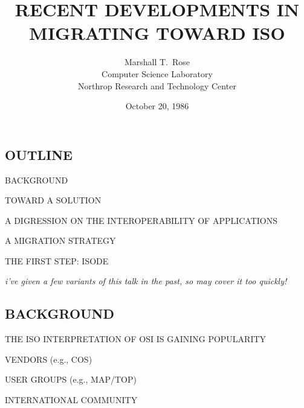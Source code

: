 



\def\tradeORGfont{\rm}
\def\tradeNAMfont{\rm}

\def\tcptpgw/{TCP $\Longleftrightarrow$ TP MAGIC-BOX}

\raggedright



\title	{RECENT DEVELOPMENTS IN\\ MIGRATING TOWARD ISO}
\author	{Marshall T.~Rose\\
	Computer Science Laboratory\\
	Northrop Research and Technology Center}
\date	{October 20, 1986}
\maketitlepage


\begin{bwslide}
\part*	{OUTLINE}\bf

\begin{nrtc}
\item	BACKGROUND
\item	TOWARD A SOLUTION
\item	A DIGRESSION ON THE INTEROPERABILITY OF APPLICATIONS
\item	A MIGRATION STRATEGY
\item	THE FIRST STEP: ISODE
\end{nrtc}
\end{bwslide}


\begin{note}\em
i've given a few variants of this talk in the past,
so may cover it too quickly!
\end{note}


\begin{bwslide}
\part	{BACKGROUND}\bf
\begin{nrtc}
\item	THE ISO INTERPRETATION OF OSI IS GAINING POPULARITY
    \begin{nrtc}
    \item	VENDORS (e.g., COS)
    \item	USER GROUPS (e.g., MAP/TOP)
    \item	INTERNATIONAL COMMUNITY
    \end{nrtc}
\end{nrtc}
\end{bwslide}


